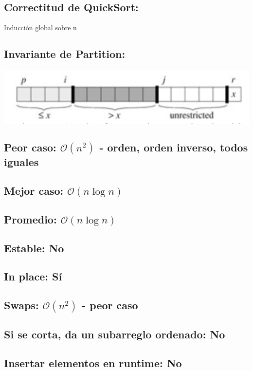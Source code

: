 \documentclass[a4paper]{article}
\begin{document}
\subsection{Correctitud de QuickSort:}
Inducci\'on global sobre n 

\subsection{Invariante de Partition:}
\includegraphics[width=1\textwidth]{invPartition}

\subsection{Peor caso: $\mathcal{O}(n^{2})$ - orden, orden inverso, todos iguales}
\subsection{Mejor caso: $\mathcal{O}(n \log{}n)$}
\subsection{Promedio: $\mathcal{O}(n \log{}n)$}
\subsection{Estable: No}
\subsection{In place: S\'i}
\subsection{Swaps: $\mathcal{O}(n^{2})$ - peor caso}
\subsection{Si se corta, da un subarreglo ordenado: No}
\subsection{Insertar elementos en runtime: No}

\newpage
\end{document}
